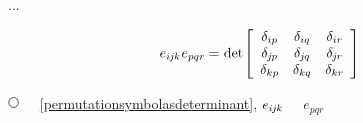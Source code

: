 ...


\nopagebreak\vspace{-0.1em}
\begin{equation}\label{theproductoftwopermutations}
e_{i\hspace{-0.1ex}j\hspace{-0.1ex}k} \hspace{.1ex} e_{pqr}
\hspace{-0.1ex} = \hspace{.1ex}
\operatorname{det} \hspace{-0.25ex} \left[
\begin{array}{ccc}
\delta_{ip} & \delta_{iq} & \delta_{ir} \\
\delta_{\hspace{-0.1ex}j\hspace{-0.1ex}p} & \delta_{\hspace{-0.1ex}j\hspace{-0.1ex}q} & \delta_{\hspace{-0.1ex}j\hspace{-0.1ex}r} \\
\delta_{kp} & \delta_{kq} & \delta_{kr}
\end{array}\hspace{-0.1ex}
\right]
\end{equation}

\noindent
${ \tikz[baseline=-1ex] \draw [line width=.5pt, color=black, fill=white] (0, 0) circle (.8ex);
\hspace{.6em} }$
~\eqref{permutationsymbolasdeterminant},
${ e_{i\hspace{-0.1ex}j\hspace{-0.1ex}k} }$~
~${ e_{pqr} }$~

